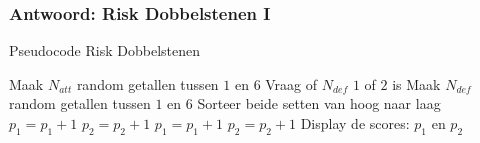 \begin{frame}
\frametitle{Antwoord: Risk Dobbelstenen I}

\begin{algorithm}[H]
\caption{Pseudocode Risk Dobbelstenen}
\begin{algorithmic}[1]
	\State Maak $N_{att}$ random getallen tussen $1$ en $6$
	\State Vraag of $N_{def}$ $1$ of $2$ is
	\State Maak $N_{def}$ random getallen tussen $1$ en $6$
	\State Sorteer beide setten van hoog naar laag
	  $p_1=p_1+1$
	\Else \hspace{0.4cm} $p_2=p_2+1$
	\EndIf
	  $p_1=p_1+1$
	\Else \hspace{0.4cm} $p_2=p_2+1$
	\EndIf
	\State Display de scores: $p_1$ en $p_2$
\EndFunction
\end{algorithmic}
\end{algorithm}

\end{frame}



